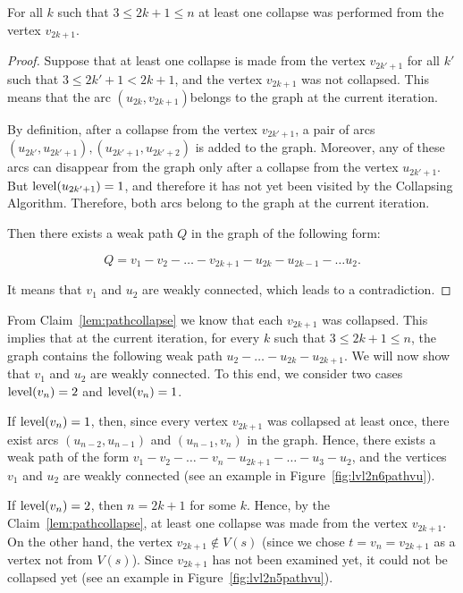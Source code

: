 \begin{claim}
\label{lem:pathcollapse}
For all $ k $ such that $ 3 \le 2k + 1 \le n $ at least one collapse was performed from the vertex $ v_{2k + 1} $.
\end{claim}
\begin{proof}
Suppose that at least one collapse is made from the vertex $ v_{2k '+ 1} $ for all $ k' $ such that $ 3 \le 2k '+ 1 <2k + 1 $, and the vertex $ v_{2k + 1} $ was not collapsed. This means that the arc $ (u_{2k}, v_{2k + 1}) $belongs to the graph at the current iteration.

By definition, after a collapse from the vertex $ v_{2k '+ 1} $, a pair of arcs $ (u_{2k'}, u_{2k '+ 1}), (u_{2k' + 1}, u_{2k '+ 2}) $ is added to the graph. Moreover, any of these arcs can disappear from the graph only after a collapse from the vertex $ u_ {2k '+ 1} $. But $\operatorname{level}(u_ {2k '+ 1})= 1 $, and therefore it has not yet been visited by the Collapsing Algorithm. Therefore, both arcs belong to the graph at the current iteration.

Then there exists a weak path $ Q $ in the graph of the following form:

$$
Q = v_1 - v_2 - \ldots - v_{2k+1} - u_{2k} - u_{2k-1} - \ldots u_2.
$$

It means that $v_1$ and $u_2$ are weakly connected, which leads to a contradiction.
\end{proof}

From Claim~\ref{lem:pathcollapse} we know that each $v_{2k+1}$ was collapsed. This implies that at the current iteration, for every $k$ such that $3\le 2k+1\le n$, the graph contains the following weak path $ u_2 - \ldots - u_{2k} - u_{2k + 1} $. We will now show that $v_1$ and $u_2$ are weakly connected. To this end, we consider two cases $ \operatorname{level} (v_{n}) = 2 $ and $ \operatorname{level} (v_{n}) = 1 $. 

If $ \operatorname{level} (v_{n}) = 1 $, then, since every vertex $ v_{2k + 1} $ was collapsed at least once, there exist arcs $(u_{n-2},u_{n-1} ) $ and $ (u_{n-1}, v_n) $ in the graph. Hence, there exists a weak path of the form $ v_1 - v_2 - \ldots - v_n - u_{2k + 1} - \ldots - u_3 - u_2 $, and the vertices $ v_1 $ and $ u_2 $ are weakly connected (see an example in Figure~\ref{fig:lvl2n6pathvu}).

If $ \operatorname{level} (v_{n}) = 2 $, then $ n = 2k + 1 $ for some $ k $. Hence, by the Claim~\ref{lem:pathcollapse}, at least one collapse was made from the vertex $ v_{2k + 1} $. On the other hand, the vertex $ v_{2k + 1} \notin V (s) $ (since we chose $t=v_n=v_{2k+1}$ as a vertex not from $V(s)$). Since $v_{2k+1}$ has not been examined yet, it could not be collapsed yet (see an example in Figure~\ref{fig:lvl2n5pathvu}).

